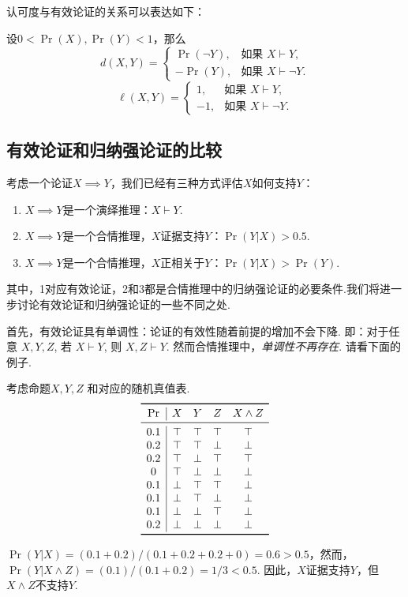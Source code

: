认可度与有效论证的关系可以表达如下：
\begin{proposition}
    设$0< \Pr(X),\Pr(Y) < 1$，那么
    \[
        d(X, Y) =
        \begin{cases}
            \Pr(\neg Y),& \text{如果 } X \vdash Y, \\
            -\Pr(Y),& \text{如果 } X \vdash \neg Y.
        \end{cases}
    \]
    \[\ell(X, Y) = 
        \begin{cases}
            1,& \text{如果 } X \vdash Y, \\
            -1,& \text{如果 } X \vdash \neg Y.
        \end{cases}
    \]
\end{proposition}


\subsection{有效论证和归纳强论证的比较}

考虑一个论证$X\implies Y$，我们已经有三种方式评估$X$如何支持$Y$：
    \begin{enumerate}
        \item $X\implies Y$是一个演绎推理：$X\vdash Y$.
        \item $X\implies Y$是一个合情推理，$X$证据支持$Y$：$\Pr(Y|X) > 0.5$.
        \item $X\implies Y$是一个合情推理，$X$正相关于$Y$：$\Pr(Y|X) > \Pr(Y)$.
    \end{enumerate}
其中，1对应有效论证，2和3都是合情推理中的归纳强论证的必要条件.我们将进一步讨论有效论证和归纳强论证的一些不同之处.

首先，有效论证具有单调性：论证的有效性随着前提的增加不会下降. 即：对于任意 $X, Y, Z$, 若 $X\vdash Y$, 则 $X,Z\vdash Y$. 然而合情推理中，\textit{单调性不再存在}. 请看下面的例子.

\begin{example}[非单调性：例子]
考虑命题$X, Y, Z$ 和对应的随机真值表.
\[\begin{array}{c|ccccc}
        \toprule
        \Pr & X & Y & Z & X \wedge Z \\ \midrule
        0.1 & \T & \T & \T & \T\\
        0.2 & \T & \T & \F & \F\\
        0.2 & \T & \F & \T & \T\\
        0 & \T & \F & \F & \F\\ 
        0.1 & \F & \T & \T & \F\\ 
        0.1 & \F & \T & \F & \F\\
        0.1 & \F & \F & \T & \F\\
        0.2 & \F & \F & \F & \F\\
        \bottomrule
\end{array}\]

$\Pr(Y|X) = (0.1 + 0.2) / (0.1 + 0.2 + 0.2 + 0) = 0.6 > 0.5$，然而，$\Pr(Y|X \wedge Z) = (0.1) / (0.1 + 0.2) = 1/3 < 0.5$. 因此，$X$证据支持$Y$，但$X\wedge Z$不支持$Y$.
\end{example}

